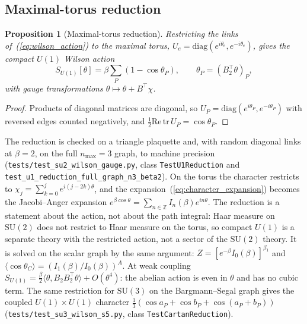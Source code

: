 \documentclass[11pt]{article}
\newtheorem{proposition}{Proposition}
\begin{document}
\subsection{Maximal-torus reduction}

\begin{proposition}[Maximal-torus reduction]
\label{prop:u1_reduction}
Restricting the links of~(\ref{eq:wilson_action}) to the maximal torus,
$U_e=\mathrm{diag}(e^{i\theta_e},e^{-i\theta_e})$, gives the compact $U(1)$
Wilson action
\begin{equation}
S_{U(1)}[\theta]=\beta\sum_P(1-\cos\theta_P),\qquad
\theta_P=(B_2^{\top}\theta)_P ,
\label{eq:u1_action}
\end{equation}
with gauge transformations $\theta\mapsto\theta+B^{\top}\chi$.
\end{proposition}

\begin{proof}
Products of diagonal matrices are diagonal, so
$U_P=\mathrm{diag}(e^{i\theta_P},e^{-i\theta_P})$ with reversed edges
counted negatively, and $\tfrac12\mathrm{Re}\,\mathrm{tr}\,U_P=\cos\theta_P$.
\end{proof}

The reduction is checked on a triangle plaquette and, with random diagonal
links at $\beta=2$, on the full $n_{\max}=3$ graph, to machine precision
(\texttt{tests/test\_su2\_wilson\_gauge.py}, class \texttt{TestU1Reduction}
and \texttt{test\_u1\_reduction\_full\_graph\_n3\_beta2}).  On the torus the
character restricts to $\chi_j=\sum_{k=0}^{j}e^{i(j-2k)\theta}$, and the
expansion~(\ref{eq:character_expansion}) becomes the Jacobi--Anger expansion
$e^{\beta\cos\theta}=\sum_{n\in\mathbb{Z}}I_n(\beta)e^{in\theta}$.  The
reduction is a statement about the action, not about the path integral:
Haar measure on $\mathrm{SU}(2)$ does not restrict to Haar measure on the
torus, so compact $U(1)$ is a separate theory with the restricted action,
not a sector of the $\mathrm{SU}(2)$ theory.  It is solved on the scalar
graph by the same argument: $Z=[e^{-\beta}I_0(\beta)]^{\beta_1}$ and
$\langle\cos\theta_C\rangle=(I_1(\beta)/I_0(\beta))^{A}$.  At weak coupling
$S_{U(1)}=\frac{\beta}{2}\langle\theta,B_2B_2^{\top}\theta\rangle+O(\theta^4)$:
the abelian action is even in $\theta$ and has no cubic term.  The same
restriction for $\mathrm{SU}(3)$ on the Bargmann--Segal graph gives the
coupled $U(1)\times U(1)$ character
$\tfrac13(\cos a_P+\cos b_P+\cos(a_P+b_P))$
(\texttt{tests/test\_su3\_wilson\_s5.py}, class \texttt{TestCartanReduction}).
\end{document}
